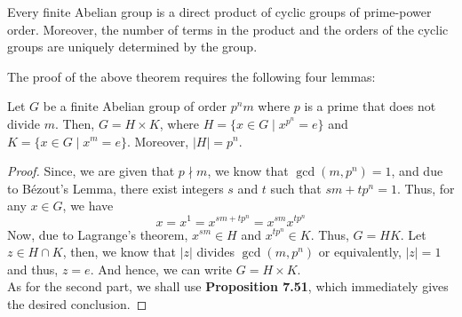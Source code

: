 \begin{theorem}
	Every finite Abelian group is a direct product of cyclic groups of prime-power order. Moreover, the number of terms in the product and the orders of the cyclic groups are uniquely determined by the group.
\end{theorem}

The proof of the above theorem requires the following four lemmas:
\begin{lemma}
	Let $G$ be a finite Abelian group of order $p^nm$ where $p$ is a prime that does not divide $m$. Then, $G=H\times K$, where $H=\{x\in G\mid x^{{p^n}}=e\}$ and $K=\{x\in G\mid x^m=e\}$. Moreover, $|H|=p^n$.
\end{lemma}
\begin{proof}
	Since, we are given that $p\nmid m$, we know that $\gcd(m,p^n)=1$, and due to B\'ezout's Lemma, there exist integers $s$ and $t$ such that $sm+tp^n=1$. Thus, for any $x\in G$, we have 
	$$
	x = x^{1} = x^{sm+tp^n} = x^{sm} x^{tp^n}
	$$
	Now, due to Lagrange's theorem, $x^{sm}\in H$ and $x^{tp^n}\in K$. Thus, $G=HK$. Let $z\in H\cap K$, then, we know that $|z|$ divides $\gcd(m,p^n)$ or equivalently, $|z|=1$ and thus, $z=e$. And hence, we can write $G=H\times K$.\\
	As for the second part, we shall use \textbf{Proposition 7.51}, which immediately gives the desired conclusion.
\end{proof}

